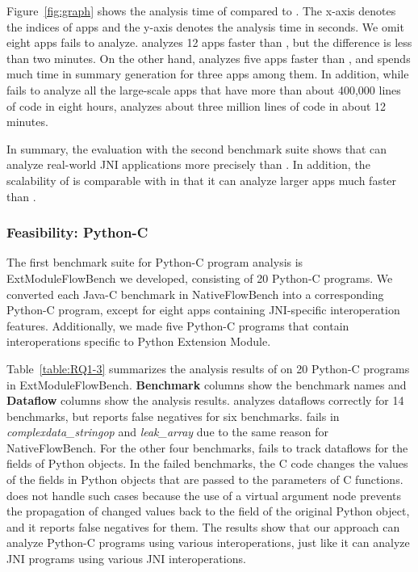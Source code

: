 Figure~\ref{fig:graph} shows the analysis time of \ours compared to \lees.
The x-axis denotes the indices of apps and the y-axis denotes the analysis time
in seconds. We omit eight apps \lees fails to analyze.
\lees analyzes 12 apps faster than \ours, but the difference is less than two
minutes. 
On the other hand, \ours analyzes five apps faster than \lees, and \lees spends
much time in summary generation for three apps among them. 
In addition, while \lees fails to analyze all the large-scale apps that have
more than about 400,000 lines of code in eight hours, \ours analyzes about
three million lines of code in about 12 minutes.

In summary, the evaluation with the second benchmark suite shows that
\ours can analyze real-world JNI applications more precisely than \lees.
In addition, the scalability of \ours is comparable with \lees in that
it can analyze larger apps much faster than \lees.

\subsubsection{Feasibility: Python-C}


The first benchmark suite for Python-C program analysis is ExtModuleFlowBench we developed,
consisting of 20 Python-C programs.
We converted each Java-C benchmark in NativeFlowBench into a
corresponding Python-C program, except for eight apps containing JNI-specific interoperation
features. Additionally, we made five Python-C programs that contain interoperations
specific to Python Extension Module.

Table~\ref{table:RQ1-3} summarizes the analysis results of \ours
on 20 Python-C programs in ExtModuleFlowBench.
{\bf Benchmark} columns show the benchmark names and {\bf Dataflow}
columns show the analysis results.
\ours analyzes dataflows correctly for 14 benchmarks, but reports false
negatives for six benchmarks.
\ours fails in {\it complexdata\_stringop} and {\it leak\_array} due to the
same reason for NativeFlowBench.
For the other four benchmarks, \ours fails to track dataflows for the fields of Python objects. 
In the failed benchmarks, the C code changes the values of the fields in Python objects that are passed
to the parameters of C functions.
\ours does not handle such cases because
the use of a virtual argument node prevents the propagation of changed values
back to the field of the original Python object, and it
reports false negatives for them.
The results show that our approach can analyze Python-C programs using various interoperations,
just like it can analyze JNI programs using various JNI interoperations.

